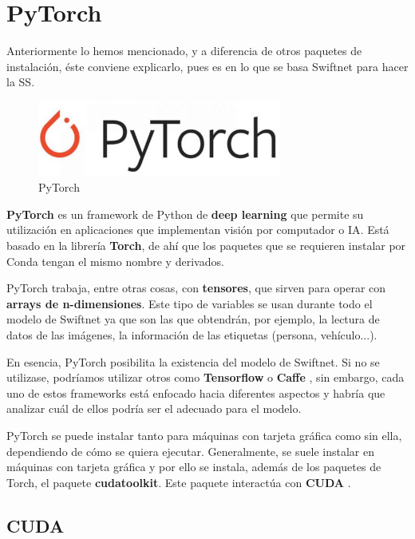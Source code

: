 \section{PyTorch}

Anteriormente lo hemos mencionado, y a diferencia de otros paquetes de instalación, éste conviene explicarlo, pues es en lo que se basa Swiftnet para hacer la \ac{SS}.

\begin{figure}[H]
  \centering
  \includegraphics[width=8cm]{Figuras/PyTorch.eps}
  \caption{PyTorch}
\end{figure}

\textbf{PyTorch} \cite{pytorch} es un framework de Python de \textbf{deep learning} que permite su utilización en aplicaciones que implementan visión por computador o IA. Está basado en la librería \textbf{Torch}, de ahí que los paquetes que se requieren instalar por Conda tengan el mismo nombre y derivados.

PyTorch trabaja, entre otras cosas, con \textbf{tensores}, que sirven para operar con \textbf{arrays de n-dimensiones}. Este tipo de variables se usan durante todo el modelo de Swiftnet ya que son las que obtendrán, por ejemplo, la lectura de datos de las imágenes, la información de las etiquetas (persona, vehículo...).

En esencia, PyTorch posibilita la existencia del modelo de Swiftnet. Si no se utilizase, podríamos utilizar otros como \textbf{Tensorflow} \cite{tensorflow} o \textbf{Caffe} \cite{caffe}, sin embargo, cada uno de estos frameworks está enfocado hacia diferentes aspectos y habría que analizar cuál de ellos podría ser el adecuado para el modelo. 

PyTorch se puede instalar tanto para máquinas con tarjeta gráfica como sin ella, dependiendo de cómo se quiera ejecutar. Generalmente, se suele instalar en máquinas con tarjeta gráfica y por ello se instala, además de los paquetes de Torch, el paquete \textbf{cudatoolkit}. Este paquete interactúa con \textbf{CUDA} \cite {cuda}.

\subsection{CUDA}

